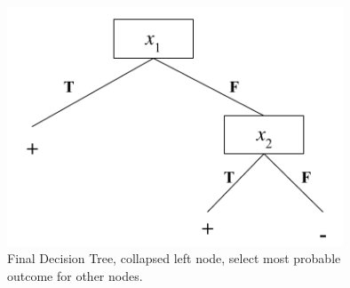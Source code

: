 \documentclass[12pt]{article}
\begin{document}
\begin{enumerate}
\begin{enumerate}
\begin{figure}[h]
\caption{Final Decision Tree, collapsed left node, select most probable outcome for other nodes.}
\includegraphics[width=10cm]{FinalTree}
\centering
\end{figure}
\newpage
\end{enumerate}
	

\end{enumerate}
\end{document}
